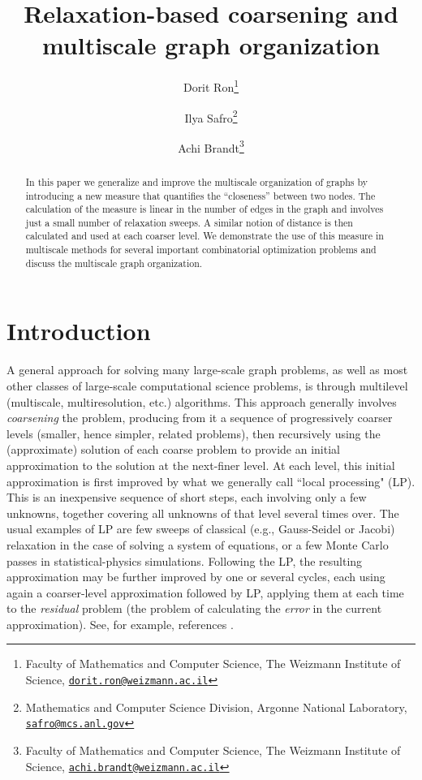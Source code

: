 \documentclass[final]{siamltex}
\title{\Large Relaxation-based coarsening and multiscale graph organization}
\author{
Dorit Ron\thanks{Faculty of Mathematics and Computer Science, The Weizmann Institute of Science, \href{mailto:dorit.ron@weizmann.ac.il}{\tt dorit.ron@weizmann.ac.il}}
\and Ilya Safro\thanks{Mathematics and Computer Science Division, Argonne National Laboratory, \href{mailto:safro@mcs.anl.gov}{\tt safro@mcs.anl.gov}}
\and Achi Brandt\thanks{Faculty of Mathematics and Computer Science, The Weizmann Institute of Science, \href{mailto:achi.brandt@weizmann.ac.il}{\tt achi.brandt@weizmann.ac.il}}
}
\begin{document}
\maketitle
\begin{abstract}
In this paper we generalize and improve the multiscale organization of graphs by introducing a new measure that quantifies the ``closeness'' between two nodes. The calculation of the measure is linear in the number of edges in the graph and involves just a small number of relaxation sweeps. A similar notion of distance is then calculated and used at each coarser level. We demonstrate the use of this measure in multiscale methods for several important combinatorial optimization problems and discuss the multiscale graph organization.
\end{abstract}

\section{Introduction}

A general approach for solving many large-scale graph problems, as
well as most other classes of large-scale computational science problems, is
through multilevel (multiscale, multiresolution, etc.)
algorithms. This approach generally involves {\it coarsening}
the problem, producing from it a sequence of progressively coarser
levels (smaller, hence simpler, related problems), then
recursively using the (approximate) solution of each coarse
problem to provide an initial approximation to the solution at the
next-finer level. At each level, this initial approximation is first
improved by what we generally call ``local processing" (LP). This
is an inexpensive sequence of short steps, each involving only a few
unknowns, together covering all unknowns of that level several
times over. The usual examples of LP are few sweeps of classical
(e.g., Gauss-Seidel or Jacobi) relaxation in the case of solving a
system of equations, or a few Monte Carlo passes in
statistical-physics simulations. Following the LP, the resulting approximation
may be further improved by one or several cycles, each
using again a coarser-level approximation followed by LP, applying  them at each time to
the {\it residual} problem (the problem of calculating the {\it
error} in the current approximation). See, for example, references
\cite{Brandt:1977:MLAa,bamg1,bmr82,bmr84,brandt-renormalization,vlsicad,rs87,safro2005}.
\end{document}
